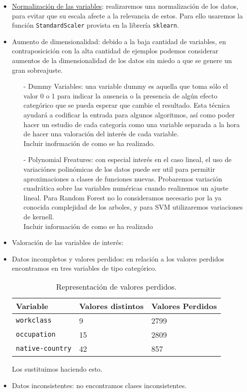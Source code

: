 \documentclass[11pt,a4paper]{article}
\begin{document}
\begin{itemize}

	\item \underline{Normalización de las variables}: realizaremos una normalización de los datos, para evitar que su escala afecte a la relevancia de estos. Para ello usaremos la función \texttt{StandardScaler}\cite{standardscaler} provista en la librería \texttt{sklearn}.
	\item Aumento de dimensionalidad: debido a la baja cantidad de variables, en contraposicición con la alta cantidad de ejemplos podemos considerar aumentos de la dimensionalidad de los datos sin miedo a que se genere un gran sobreajuste.
	\begin{itemize}
	\item[-] Dummy Variables: una variable dummy es aquella que toma sólo el valor 0 o 1 para indicar la ausencia o la presencia de algún efecto categórico que se pueda esperar que cambie el resultado. Esta técnica ayudará a codificar la entrada para algunos algoritmos, así como poder hacer un estudio de cada categoría como una variable separada a la hora de hacer una valoración del interés de cada variable.\\
	
	Incluir inofrmación de como se ha realizado.
	 
	\item[-] Polynomial Freatures: con especial interés en el caso lineal, el uso de variaciónes polinómicas de los datos puede ser util para permitir aproximaciones a clases de funciones nuevas. Probaremos variación cuadrática sobre las variables numéricas cuando realizemos un ajuste lineal. Para Random Forest no lo consideramos necesario por la ya conocida complejidad de los arboles, y para SVM utilizaremos variaciones de kernell. \\
	
	Incluir información de como se ha realizado
\end{itemize}
	\item Valoración de las variables de interés: 
	\item Datos incompletos y valores perdidos: en relación a los valores perdidos encontramos en tres variables de tipo categórico.\\
	
\begin{table}[h]
\begin{center}
\begin{tabular}{|l|ll|}
\hline
Variable& Valores distintos & Valores Perdidos\\ \hline
\texttt{workclass} & 9 & 2799\\
\texttt{occupation} & 15 & 2809\\
\texttt{native-country} & 42 & 857\\\hline
\end{tabular}
\end{center}
\caption{Representación de valores perdidos.}
	\end{table}
	
	Los sustituimos haciendo esto.
	\item Datos inconsistentes: no encontramos clases inconsistentes.
\end{itemize}
\end{document}
